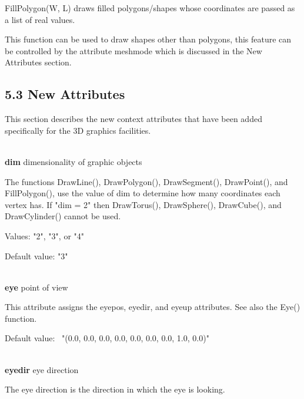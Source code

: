 \documentclass[letterpaper]{article}
\begin{document}
{FillPolygon(W, L) draws filled polygons/shapes whose coordinates
are passed as a list of real values.


\bigskip

This function can be used to draw shapes other than polygons, this
feature can be controlled by the attribute
\textsf{meshmode} which is discussed in the New Attributes section.


\bigskip

\subsection[5.3 New Attributes]{5.3 New Attributes}


\bigskip

This section describes the new context attributes that have been
added specifically for the 3D graphics facilities.


\bigskip

\noindent\hrulefill\\
\noindent\textsf{\textbf{dim}} \hfill dimensionality of graphic objects

\bigskip

The functions
\textsf{DrawLine(), DrawPolygon(), DrawSegment(), DrawPoint()},
and \textsf{FillPolygon()}, use the value of
\textsf{dim} to determine how many coordinates each vertex has. If
\textsf{"dim = 2"} then
\textsf{DrawTorus(), DrawSphere(), DrawCube()}, and
\textsf{DrawCylinder()} cannot be used.


\bigskip

Values: \textsf{"2"}, \textsf{"3"}, or \textsf{"4"}

Default value: \textsf{"3"}

\noindent\hrulefill\\
\noindent\textsf{\textbf{eye}} \hfill point of view


\bigskip

This attribute assigns the eyepos, eyedir, and eyeup attributes.
See also the \textsf{Eye()} function.


\bigskip

Default value: \ \textsf{"(0.0, 0.0, 0.0, 0.0, 0.0, 0.0, 0.0, 1.0, 0.0)"}

\noindent\hrulefill\\
\noindent\textsf{\textbf{eyedir}} \hfill eye direction


\bigskip

The eye direction is the direction in which the eye is looking.


\bigskip

}
\end{document}

